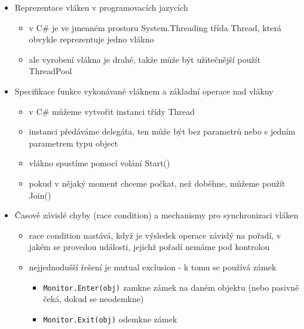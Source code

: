 \begin{itemize}
\begin{itemize}
\begin{itemize}
\item garbage collector se pouští podle toho, zda je potřeba uvolnit paměť
\item fungují tam tři generace (vrstvy) objektů
\item vytváří se graf objektů, aby bylo jasné, které jsou používané a které je možné smazat
\item po smazání se zbylé objekty na haldě přeskupují (tzv. heap compacting)
\item GC má dva módy - workstation a server (v server módu běží GC na více vláknech)
\end{itemize}
\end{itemize}
\item Reprezentace vláken v programovacích jazycích
\begin{itemize}
\item v C\# je ve jmenném prostoru System.Threading třída Thread, která obvykle reprezentuje jedno vlákno
\item ale vyrobení vlákna je drahé, takže může být užitečnější použít ThreadPool
\end{itemize}
\item Specifikace funkce vykonávané vláknem a základní operace nad vlákny
\begin{itemize}
\item v C\# můžeme vytvořit instanci třídy Thread
\item instanci předáváme delegáta, ten může být bez parametrů nebo s jedním parametrem typu object
\item vlákno spustíme pomocí volání Start()
\item pokud v nějaký moment chceme počkat, než doběhne, můžeme použít Join()
\end{itemize}
\item Časově závislé chyby (race condition) a mechanismy pro synchronizaci vláken
\begin{itemize}
\item race condition nastává, když je výsledek operace závislý na pořadí, v jakém se provedou události, jejichž pořadí nemáme pod kontrolou
\item nejjednodušší řešení je mutual exclusion - k tomu se používá zámek
\begin{itemize}
\item \texttt{Monitor.\allowbreak{}Enter(\allowbreak{}obj)\allowbreak{}} zamkne zámek na daném objektu (nebo pasivně čeká, dokud se neodemkne)
\item \texttt{Monitor.\allowbreak{}Exit(\allowbreak{}obj)\allowbreak{}} odemkne zámek

\end{itemize}
\end{itemize}
\end{itemize}
